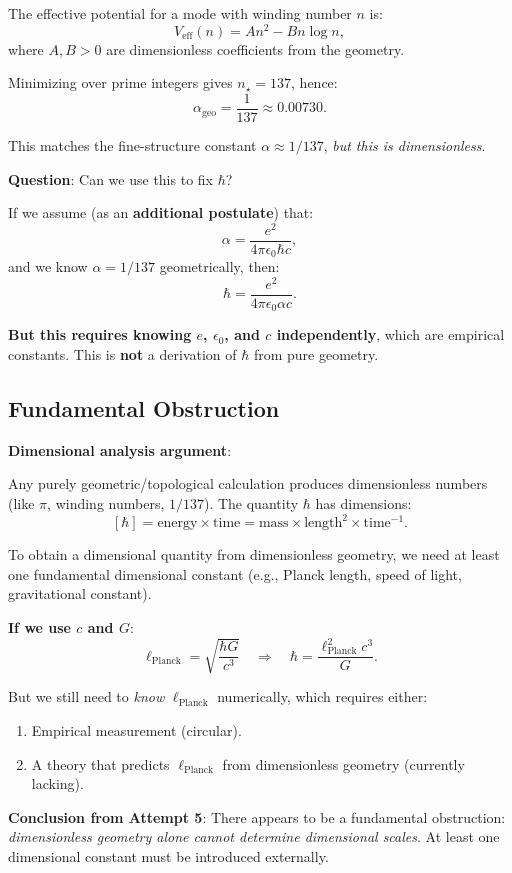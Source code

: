 \documentclass[12pt]{article}
\begin{document}
The effective potential for a mode with winding number $n$ is:
\[
V_{\text{eff}}(n) = A n^2 - B n \log n,
\]
where $A, B > 0$ are dimensionless coefficients from the geometry.

Minimizing over prime integers gives $n_\star = 137$, hence:
\[
\alpha_{\text{geo}} = \frac{1}{137} \approx 0.00730.
\]

This matches the fine-structure constant $\alpha \approx 1/137$, \emph{but this is dimensionless}.

\textbf{Question}: Can we use this to fix $\hbar$?

If we assume (as an \textbf{additional postulate}) that:
\[
\alpha = \frac{e^2}{4\pi \epsilon_0 \hbar c},
\]
and we know $\alpha = 1/137$ geometrically, then:
\[
\hbar = \frac{e^2}{4\pi \epsilon_0 \alpha c}.
\]

\textbf{But this requires knowing $e$, $\epsilon_0$, and $c$ independently}, which are empirical constants. This is \textbf{not} a derivation of $\hbar$ from pure geometry.

\subsection{Fundamental Obstruction}

\textbf{Dimensional analysis argument}:

Any purely geometric/topological calculation produces dimensionless numbers (like $\pi$, winding numbers, $1/137$). The quantity $\hbar$ has dimensions:
\[
[\hbar] = \text{energy} \times \text{time} = \text{mass} \times \text{length}^2 \times \text{time}^{-1}.
\]

To obtain a dimensional quantity from dimensionless geometry, we need at least one fundamental dimensional constant (e.g., Planck length, speed of light, gravitational constant).

\textbf{If we use $c$ and $G$}:
\[
\ell_{\text{Planck}} = \sqrt{\frac{\hbar G}{c^3}} \quad \Rightarrow \quad \hbar = \frac{\ell_{\text{Planck}}^2 c^3}{G}.
\]

But we still need to \emph{know} $\ell_{\text{Planck}}$ numerically, which requires either:
\begin{enumerate}
\item Empirical measurement (circular).
\item A theory that predicts $\ell_{\text{Planck}}$ from dimensionless geometry (currently lacking).
\end{enumerate}

\textbf{Conclusion from Attempt 5}: There appears to be a fundamental obstruction: \emph{dimensionless geometry alone cannot determine dimensional scales}. At least one dimensional constant must be introduced externally.
\end{document}
